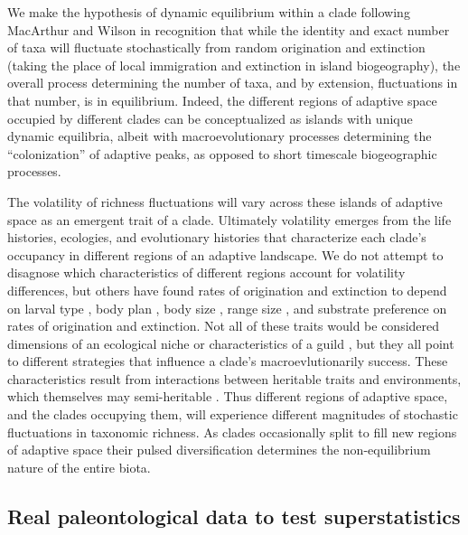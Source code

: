 \documentclass[12pt]{article}
\let\citep=\cite
\begin{document}
We make the hypothesis of dynamic equilibrium within a clade following
MacArthur and Wilson \citep{macWilson} in recognition that while the
identity and exact number of taxa will fluctuate stochastically from
random origination and extinction (taking the place of local
immigration and extinction in island biogeography), the overall
process determining the number of taxa, and by extension, fluctuations
in that number, is in equilibrium. Indeed, the different regions of
adaptive space occupied by different clades can be conceptualized as
islands with unique dynamic equilibria, albeit with macroevolutionary
processes determining the ``colonization'' of adaptive peaks, as
opposed to short timescale biogeographic processes.

The volatility of richness fluctuations will vary across these islands
of adaptive space as an emergent trait of a clade. Ultimately
volatility emerges from the life histories, ecologies, and
evolutionary histories that characterize each clade's occupancy in
different regions of an adaptive landscape. We do not attempt to
disagnose which characteristics of different regions account for
volatility differences, but others have found rates of origination and
extinction to depend on larval type \citep{jablonski2008}, body plan
\citep{erwin2012}, body size \citep{harnik2011}, range size
\citep{harnik2011, foote2008paleobiol}, and substrate preference
\citep{hopkins2014} on rates of origination and extinction. Not all of
these traits would be considered dimensions of an ecological niche or
characteristics of a guild \citep{bambach1983, bambach2007, bush2007},
but they all point to different strategies that influence a clade's
macroevlutionarily success. These characteristics result from
interactions between heritable traits and environments, which
themselves may semi-heritable \citep{nicheCons}. Thus different
regions of adaptive space, and the clades occupying them, will
experience different magnitudes of stochastic fluctuations in
taxonomic richness. As clades occasionally split to fill new regions
of adaptive space their pulsed diversification determines the
non-equilibrium nature of the entire biota.




\subsection{Real paleontological data to test superstatistics}
\end{document}
